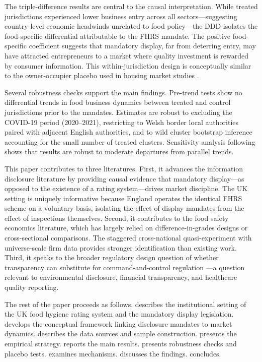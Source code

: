 \documentclass[12pt]{article}
\begin{document}
The triple-difference results are central to the causal interpretation. While treated jurisdictions experienced lower business entry across all sectors---suggesting country-level economic headwinds unrelated to food policy---the DDD isolates the food-specific differential attributable to the FHRS mandate. The positive food-specific coefficient suggests that mandatory display, far from deterring entry, may have attracted entrepreneurs to a market where quality investment is rewarded by consumer information. This within-jurisdiction design is conceptually similar to the owner-occupier placebo used in housing market studies \citep{dranove2003quality}.

Several robustness checks support the main findings. Pre-trend tests show no differential trends in food business dynamics between treated and control jurisdictions prior to the mandates. Estimates are robust to excluding the COVID-19 period (2020--2021), restricting to Welsh border local authorities paired with adjacent English authorities, and to wild cluster bootstrap inference accounting for the small number of treated clusters. Sensitivity analysis following \citet{rambachan2023more} shows that results are robust to moderate departures from parallel trends.

This paper contributes to three literatures. First, it advances the information disclosure literature \citep{jin2003effect, dranove2003quality, ho2012does} by providing causal evidence that mandatory display---as opposed to the existence of a rating system---drives market discipline. The UK setting is uniquely informative because England operates the identical FHRS scheme on a voluntary basis, isolating the effect of display mandates from the effect of inspections themselves. Second, it contributes to the food safety economics literature, which has largely relied on difference-in-grades designs \citep{jin2003effect} or cross-sectional comparisons. The staggered cross-national quasi-experiment with universe-scale firm data provides stronger identification than existing work. Third, it speaks to the broader regulatory design question of whether transparency can substitute for command-and-control regulation \citep{djankov2002regulation, mathios2000impact, brown2012mandatory}---a question relevant to environmental disclosure, financial transparency, and healthcare quality reporting.

The rest of the paper proceeds as follows.  describes the institutional setting of the UK food hygiene rating system and the mandatory display legislation.  develops the conceptual framework linking disclosure mandates to market dynamics.  describes the data sources and sample construction.  presents the empirical strategy.  reports the main results.  presents robustness checks and placebo tests.  examines mechanisms.  discusses the findings.  concludes.
\end{document}
